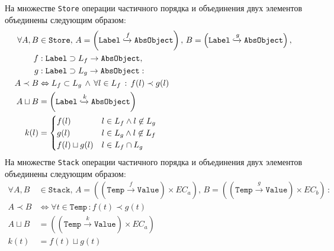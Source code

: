 На множестве \texttt{Store} операции частичного порядка и объединения
двух элементов объединены следующим образом:
\begin{align*}
  \forall A, B &\in \texttt{Store},\,
  A=\left(\texttt{Label}\xhookrightarrow{f}\texttt{AbsObject}\right),\, 
  B=\left(\texttt{Label}\xhookrightarrow{g}\texttt{AbsObject}\right),\,\\
  f&: \texttt{Label} \supset L_f \rightarrow \texttt{AbsObject},\,\\
  g&: \texttt{Label} \supset L_g \rightarrow \texttt{AbsObject}:\\
  A \prec B &\Leftrightarrow L_f \subset L_g\, \land\, \forall l \in
  L_f\,:\,f(l) \prec g(l)\\
  A \sqcup B &= \left(\texttt{Label}\xhookrightarrow{k}\texttt{AbsObject}\right) \\
  k(l) &= \begin{cases}
    f(l) & l \in L_f \land l \not\in L_g \\
    g(l) & l \in L_g \land l \not\in L_f \\
    f(l) \sqcup g(l) & l \in L_f \cap L_g \\
  \end{cases}
\end{align*}%
На множестве \texttt{Stack} операции частичного порядка и объединения
двух элементов объединены следующим образом:
\begin{align*}
  \forall A, B &\in \texttt{Stack},\, A=\left(\left(\mathtt{Temp}
  \xrightarrow{f} \mathtt{Value}\right) \times EC_a \right),\,
  B=\left(\left(\mathtt{Temp}
  \xrightarrow{g} \mathtt{Value}\right) \times EC_b \right)\,:\\
  A \prec B &\Leftrightarrow \forall t \in \texttt{Temp}\,: f(t) \prec g(t)\\
  A \sqcup B &= \left(  \left(\mathtt{Temp} \xrightarrow{k}
  \mathtt{Value}\right) \times EC_a \right)\\
  k(t) &= f(t) \sqcup g(t)
\end{align*}

